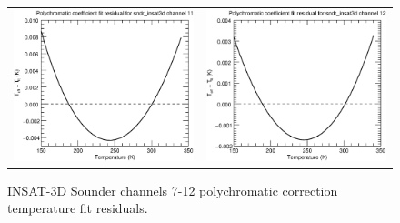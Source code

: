 \begin{figure}[H]
\begin{tabular}{c c}
    \includegraphics[scale=0.35]{graphics/sndr/tfit/sndr_insat3d-11.tfit.eps} &
    \includegraphics[scale=0.35]{graphics/sndr/tfit/sndr_insat3d-12.tfit.eps} \\
  \end{tabular}
  \caption{INSAT-3D Sounder channels 7-12 polychromatic correction temperature fit residuals.}
  \label{fig:sndr_ch7-12_tfit}
\end{figure}

